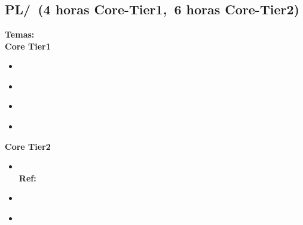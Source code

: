 \section{\PL}\label{sec:BOK:PL}
\PLBOKDescription


\subsection{PL/\PLObjectOrientedProgramming~(4 horas Core-Tier1,~6 horas Core-Tier2)}\label{sec:BOK:PLObjectOrientedProgramming}
\noindent \textbf{Temas:}\\
\noindent \textbf{Core Tier1}
\begin{itemize}
	\item \PLObjectOrientedProgrammingTopicObject\label{sec:BOK:PLObjectOrientedProgrammingTopicObject}
	\item \PLObjectOrientedProgrammingTopicDefinition\label{sec:BOK:PLObjectOrientedProgrammingTopicDefinition}
	\item \PLObjectOrientedProgrammingTopicSubclasses\label{sec:BOK:PLObjectOrientedProgrammingTopicSubclasses}
	\item \PLObjectOrientedProgrammingTopicDynamic\label{sec:BOK:PLObjectOrientedProgrammingTopicDynamic}
\end{itemize}

\noindent \textbf{Core Tier2}
\begin{itemize}
	\item \PLObjectOrientedProgrammingTopicSubtyping\xspace \\ \textbf{Ref:} \label{sec:BOK:PLObjectOrientedProgrammingTopicSubtyping}
	\item \PLObjectOrientedProgrammingTopicObjectOriented\label{sec:BOK:PLObjectOrientedProgrammingTopicObjectOriented}
	\item \PLObjectOrientedProgrammingTopicUsing\label{sec:BOK:PLObjectOrientedProgrammingTopicUsing}
\end{itemize}


